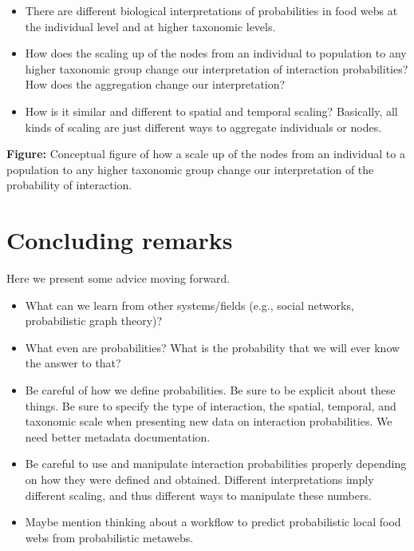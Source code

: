 \documentclass[10pt,oneside]{article}
\begin{document}
\begin{itemize}
\tightlist
\item
  There are different biological interpretations of probabilities in
  food webs at the individual level and at higher taxonomic levels.
\item
  How does the scaling up of the nodes from an individual to population
  to any higher taxonomic group change our interpretation of interaction
  probabilities? How does the aggregation change our interpretation?
\item
  How is it similar and different to spatial and temporal scaling?
  Basically, all kinds of scaling are just different ways to aggregate
  individuals or nodes.
\end{itemize}

\textbf{Figure:} Conceptual figure of how a scale up of the nodes from
an individual to a population to any higher taxonomic group change our
interpretation of the probability of interaction.

\hypertarget{concluding-remarks}{%
\section{Concluding remarks}\label{concluding-remarks}}

Here we present some advice moving forward.

\begin{itemize}
\tightlist
\item
  What can we learn from other systems/fields (e.g., social networks,
  probabilistic graph theory)?
\item
  What even are probabilities? What is the probability that we will ever
  know the answer to that?
\item
  Be careful of how we define probabilities. Be sure to be explicit
  about these things. Be sure to specify the type of interaction, the
  spatial, temporal, and taxonomic scale when presenting new data on
  interaction probabilities. We need better metadata documentation.
\item
  Be careful to use and manipulate interaction probabilities properly
  depending on how they were defined and obtained. Different
  interpretations imply different scaling, and thus different ways to
  manipulate these numbers.
\item
  Maybe mention thinking about a workflow to predict probabilistic local
  food webs from probabilistic metawebs.
\end{itemize}
\end{document}

